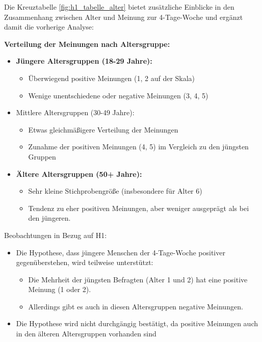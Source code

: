 Die Kreuztabelle \ref*{fig:h1_tabelle_alter} bietet zusätzliche Einblicke in den Zusammenhang zwischen Alter und Meinung zur 
4-Tage-Woche und ergänzt damit die vorherige Analyse:

\textbf{Verteilung der Meinungen nach Altersgruppe:}

\begin{itemize}
    \item \textbf{Jüngere Altersgruppen (18-29 Jahre):}
    \begin{itemize}
        \item Überwiegend positive Meinungen (1, 2 auf der Skala)
        \item Wenige unentschiedene oder negative Meinungen (3, 4, 5)
    \end{itemize}
    \item Mittlere Altersgruppen (30-49 Jahre):
    \begin{itemize}
        \item Etwas gleichmäßigere Verteilung der Meinungen 
        \item Zunahme der positiven Meinungen (4, 5) im Vergleich zu den jüngsten Gruppen
    \end{itemize}
    \item \textbf{Ältere Altersgruppen (50+ Jahre):}
    \begin{itemize}
        \item Sehr kleine Stichprobengröße (insbesondere für Alter 6) 
        \item Tendenz zu eher positiven Meinungen, aber weniger ausgeprägt als bei den jüngeren.
    \end{itemize}
\end{itemize}

Beobachtungen in Bezug auf H1:

\begin{itemize}
    \item Die Hypothese, dass jüngere Menschen der 4-Tage-Woche positiver gegenüberstehen,
    wird teilweise unterstützt:
    \begin{itemize}
        \item Die Mehrheit der jüngsten Befragten (Alter 1 und 2) hat eine positive Meinung (1 oder 2).
        \item Allerdings gibt es auch in diesen Altersgruppen negative Meinungen.
    \end{itemize}
    \item Die Hypothese wird nicht durchgängig bestätigt, da positive Meinungen auch in den 
    älteren Altersgruppen vorhanden sind
\end{itemize}

